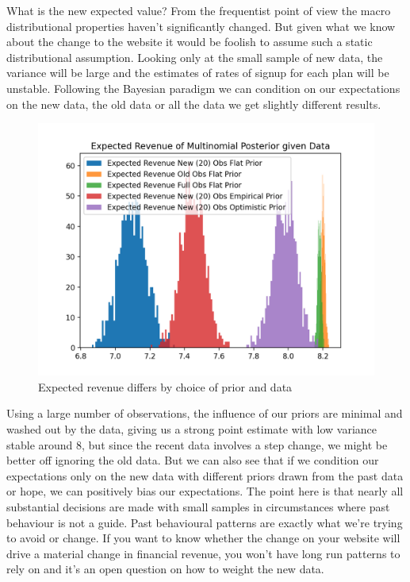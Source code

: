 \documentclass[10pt,a4paper,notitlepage, twocolumn]{article}
\begin{document}
What is the new expected value? From the frequentist point of view the macro distributional properties haven't significantly changed. But given what we know about the change to the website it would be foolish to assume such a static distributional assumption. Looking only at the small sample of new data, the variance will be large and the estimates of rates of signup for each plan will be unstable.  Following the Bayesian paradigm we can condition on our expectations on the new data, the old data or all the data we get slightly different results. 

\begin{figure}[H]
  \includegraphics[width=\linewidth]{./Plots/expected_revenue_distributions.png}
  \caption{Expected revenue differs by choice of prior and data}
\end{figure}

Using a large number of observations, the influence of our priors are minimal and washed out by the data, giving us a strong point estimate with low variance stable around 8, but since the recent data involves a step change, we might be better off ignoring the old data. But we can also see that if we condition our expectations only on the new data with different priors drawn from the past data or hope, we can positively bias our expectations. The point here is that nearly all substantial decisions are made with small samples in circumstances where past behaviour is not a guide. Past behavioural patterns are exactly what we're trying to avoid or change. If you want to know whether the change on your website will drive a material change in financial revenue, you won't have long run patterns to rely on and it's an open question on how to weight the new data. 
\end{document}
